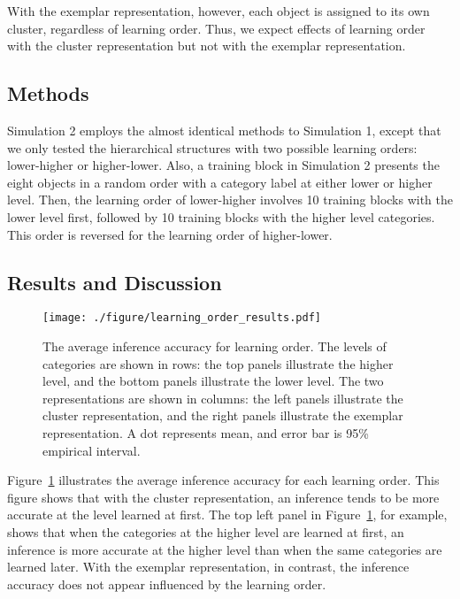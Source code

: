 \documentclass[doc]{apa6}
\begin{document}
With the exemplar representation, however, each object is assigned to its own cluster, regardless of
learning order. Thus, we expect effects of learning order with the cluster representation but not
with the exemplar representation.


\subsection*{Methods}

Simulation 2 employs the almost identical methods to Simulation 1, except that we only tested the
hierarchical structures with two possible learning orders: lower-higher or higher-lower. Also, a
training block in Simulation 2 presents the eight objects in a random order with a category label at
either lower or higher level. Then, the learning order of lower-higher involves 10 training blocks
with the lower level first, followed by 10 training blocks with the higher level categories. This
order is reversed for the learning order of higher-lower.

\subsection*{Results and Discussion}

\begin{figure}[t!]
    \centering
    \texttt{[image: ./figure/learning\_order\_results.pdf]}

    \caption{The average inference accuracy for learning order.  The levels of categories are shown
    in rows: the top panels illustrate the higher level, and the bottom panels illustrate the lower
    level.  The two representations are shown in columns: the left panels illustrate the cluster
    representation, and the right panels illustrate the exemplar representation.  A dot represents
    mean, and error bar is 95\% empirical interval.}

\label{fig:result2}
\end{figure}

Figure~\ref{fig:result2} illustrates the average inference accuracy for each learning order. This
figure shows that with the cluster representation, an inference tends to be more accurate at the
level learned at first.  The top left panel in Figure~\ref{fig:result2}, for example, shows that
when the categories at the higher level are learned at first, an inference is more accurate at the
higher level than when the same categories are learned later. With the exemplar representation, in
contrast, the inference accuracy does not appear influenced by the learning order.
\end{document}
